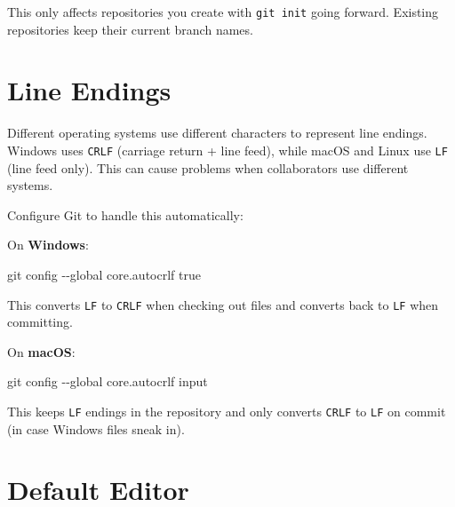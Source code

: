 \documentclass[
  letterpaper,
  DIV=11,
  numbers=noendperiod]{scrreprt}
\newenvironment{Shaded}{\begin{snugshade}}{\end{snugshade}}
\newcommand{\AttributeTok}[1]{\textcolor[rgb]{0.40,0.45,0.13}{#1}}
\newcommand{\FunctionTok}[1]{\textcolor[rgb]{0.28,0.35,0.67}{#1}}
\newcommand{\NormalTok}[1]{\textcolor[rgb]{0.00,0.23,0.31}{#1}}
\begin{document}
This only affects repositories you create with \texttt{git\ init} going
forward. Existing repositories keep their current branch names.

\section{Line Endings}\label{line-endings}

Different operating systems use different characters to represent line
endings. Windows uses \texttt{CRLF} (carriage return + line feed), while
macOS and Linux use \texttt{LF} (line feed only). This can cause
problems when collaborators use different systems.

Configure Git to handle this automatically:

On \textbf{Windows}:

\begin{codelisting}

\caption{\texttt{terminal}}

\begin{Shaded}
\begin{Highlighting}[]
\FunctionTok{git}\NormalTok{ config }\AttributeTok{{-}{-}global}\NormalTok{ core.autocrlf true}
\end{Highlighting}
\end{Shaded}

\end{codelisting}

This converts \texttt{LF} to \texttt{CRLF} when checking out files and
converts back to \texttt{LF} when committing.

On \textbf{macOS}:

\begin{codelisting}

\caption{\texttt{terminal}}

\begin{Shaded}
\begin{Highlighting}[]
\FunctionTok{git}\NormalTok{ config }\AttributeTok{{-}{-}global}\NormalTok{ core.autocrlf input}
\end{Highlighting}
\end{Shaded}

\end{codelisting}

This keeps \texttt{LF} endings in the repository and only converts
\texttt{CRLF} to \texttt{LF} on commit (in case Windows files sneak in).

\section{Default Editor}\label{default-editor}
\end{document}
